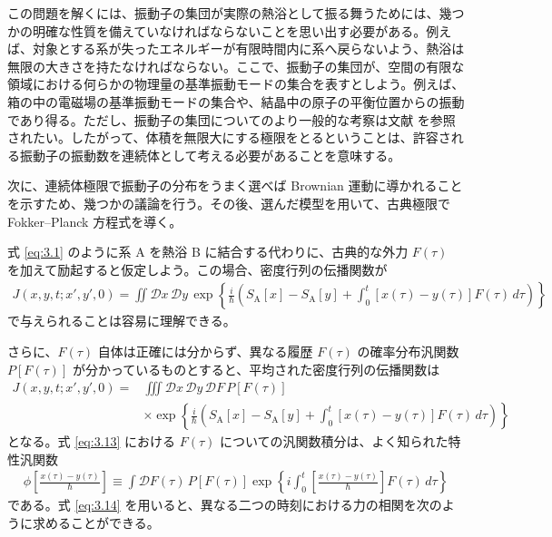 この問題を解くには、振動子の集団が実際の熱浴として振る舞うためには、幾つかの明確な性質を備えていなければならないことを思い出す必要がある。例えば、対象とする系が失ったエネルギーが有限時間内に系へ戻らないよう、熱浴は無限の大きさを持たなければならない。ここで、振動子の集団が、空間の有限な領域における何らかの物理量の基準振動モードの集合を表すとしよう。例えば、箱の中の電磁場の基準振動モードの集合や、結晶中の原子の平衡位置からの振動であり得る。ただし、振動子の集団についてのより一般的な考察は文献 \cite{ref21} を参照されたい。したがって、体積を無限大にする極限をとるということは、許容される振動子の振動数を連続体として考える必要があることを意味する。

次に、連続体極限で振動子の分布をうまく選べば Brownian 運動に導かれることを示すため、幾つかの議論を行う。その後、選んだ模型を用いて、古典極限で Fokker--Planck 方程式を導く。

式 \eqref{eq:3.1} のように系 A を熱浴 B に結合する代わりに、古典的な外力 $F(\tau)$ を加えて励起すると仮定しよう。この場合、密度行列の伝播関数が
\begin{equation}
 \begin{aligned}
 J(x,y,t;x',y',0)=\iint\mathcal D x\,\mathcal D y\,
 \exp\left\{\frac{i}{\hbar}\left(S_{\mathrm A}[x]-S_{\mathrm A}[y]
 +\int_0^t[x(\tau)-y(\tau)]F(\tau)\,d\tau\right)\right\}
 \end{aligned}
 \tag{3.12}\label{eq:3.12}
\end{equation}
で与えられることは容易に理解できる\cite{ref22}。

さらに、$F(\tau)$ 自体は正確には分からず、異なる履歴 $F(\tau)$ の確率分布汎関数 $P[F(\tau)]$ が分かっているものとすると、平均された密度行列の伝播関数は
\begin{equation}
 \begin{aligned}
 J(x,y,t;x',y',0)={}&\iiint\mathcal D x\,\mathcal D y\,\mathcal D F\,P[F(\tau)]\\
 &\times\exp\left\{\frac{i}{\hbar}\left(S_{\mathrm A}[x]-S_{\mathrm A}[y]
 +\int_0^t[x(\tau)-y(\tau)]F(\tau)\,d\tau\right)\right\}
 \end{aligned}
 \tag{3.13}\label{eq:3.13}
\end{equation}
となる。式 \eqref{eq:3.13} における $F(\tau)$ についての汎関数積分は、よく知られた特性汎関数\cite{ref22}
\begin{equation}
 \begin{aligned}
 \phi\left[\frac{x(\tau)-y(\tau)}{\hbar}\right]
 \equiv\int\mathcal D F(\tau)\,P[F(\tau)]
 \exp\left\{i\int_0^t\left[\frac{x(\tau)-y(\tau)}{\hbar}\right]F(\tau)\,d\tau\right\}
 \end{aligned}
 \tag{3.14}\label{eq:3.14}
\end{equation}
である。式 \eqref{eq:3.14} を用いると、異なる二つの時刻における力の相関を次のように求めることができる。
